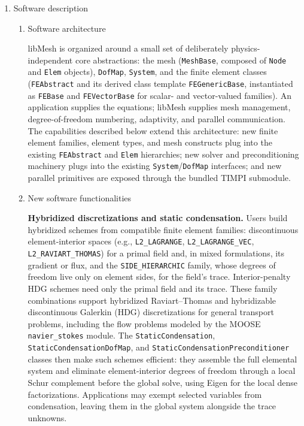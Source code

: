 \documentclass[preprint,12pt, a4paper]{elsarticle}
\begin{document}
\begin{enumerate}
\item Software description

\begin{enumerate}

\item Software architecture

libMesh is organized around a small set of deliberately physics-independent core abstractions:
the mesh (\texttt{MeshBase}, composed of \texttt{Node} and \texttt{Elem} objects),
\texttt{DofMap}, \texttt{System}, and the finite element classes (\texttt{FEAbstract} and its
derived class template \texttt{FEGenericBase}, instantiated as \texttt{FEBase} and
\texttt{FEVectorBase} for scalar- and vector-valued families). An
application supplies the equations; libMesh supplies mesh management, degree-of-freedom
numbering, adaptivity, and parallel communication. The capabilities described below extend this
architecture: new finite element families, element types, and mesh constructs plug into the
existing \texttt{FEAbstract} and \texttt{Elem} hierarchies;
new solver and preconditioning machinery plugs into the existing \texttt{System}/\texttt{DofMap}
interfaces; and new parallel primitives are exposed through the bundled TIMPI submodule.

\item New software functionalities

\textbf{Hybridized discretizations and static condensation.} Users build hybridized schemes from
compatible finite element families: discontinuous element-interior spaces (e.g.,
\texttt{L2\_LAGRANGE}, \texttt{L2\_LAGRANGE\_VEC}, \texttt{L2\_RAVIART\_THOMAS}) for a primal field
and, in mixed formulations, its gradient or flux, and the \texttt{SIDE\_HIERARCHIC} family, whose
degrees of freedom live only on element sides, for the field's trace. Interior-penalty HDG
schemes need only the primal field and its trace. These family combinations support hybridized
Raviart--Thomas and hybridizable discontinuous Galerkin (HDG) discretizations for general transport
problems, including the flow problems modeled by the MOOSE
\texttt{navier\_stokes} module. The \texttt{StaticCondensation},
\texttt{StaticCondensationDofMap}, and \texttt{StaticCondensationPreconditioner} classes then make
such schemes efficient: they assemble the full elemental system and eliminate element-interior
degrees of freedom through a local Schur complement before the global solve, using Eigen for the
local dense factorizations. Applications may exempt selected variables from condensation, leaving
them in the global system alongside the trace unknowns.


\end{enumerate}
\end{enumerate}
\end{document}
